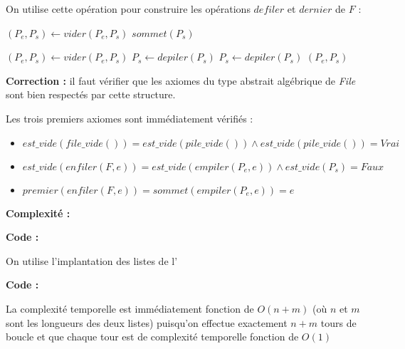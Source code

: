\documentclass[../main.tex]{subfiles}
\begin{document}
On utilise cette opération pour construire les opérations $defiler$ et $dernier$ de $F$ :

\begin{algorithm}
\caption{$dernier(F)$}\label{alg:dernier}
 {
	$(P_e, P_s) \leftarrow vider(P_e, P_s)$ 
}
\Return $sommet(P_s)$
\end{algorithm}
\begin{algorithm}
\caption{$defiler(F)$}\label{alg:defiler}
 {
	$(P_e, P_s) \leftarrow vider(P_e, P_s)$ 
	$P_s \leftarrow depiler(P_s)$\;
} {
	$P_s \leftarrow depiler(P_s)$\;
}
\Return $(P_e, P_s)$
\end{algorithm}

\textbf{Correction :} il faut vérifier que les axiomes du type abstrait algébrique de \textit{File} sont bien respectés par cette structure.

Les trois premiers axiomes sont immédiatement vérifiés :
\begin{itemize}
	\item $est\_vide(file\_vide()) = est\_vide(pile\_vide()) \wedge est\_vide(pile\_vide()) = \textit{Vrai}$
	\item $est\_vide(enfiler(F, e)) = est\_vide(empiler(P_e, e)) \wedge est\_vide(P_s) = \textit{Faux}$
	\item $premier(enfiler(F, e)) = sommet(empiler(P_e, e)) = e$
\end{itemize}

\textbf{Complexité :}


\textbf{Code :} 


On utilise l'implantation des listes de l'

\textbf{Code :} 

La complexité temporelle est immédiatement fonction de $O(n + m)$ (où $n$ et $m$ sont les longueurs des deux listes) puisqu'on effectue exactement $n + m$ tours de boucle et que chaque tour est de complexité temporelle fonction de $O(1)$
\end{document}
